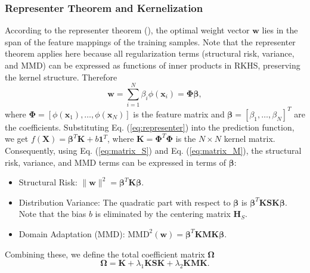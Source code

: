 \documentclass[a4paper]{cas-sc}
\begin{document}
\subsubsection{Representer Theorem and Kernelization}
According to the representer theorem (\cite{scholkopf2001representer}), the optimal weight vector $\boldsymbol{w}$ lies in the span of the feature mappings of the training samples. Note that the representer theorem applies here because all regularization terms (structural risk, variance, and MMD) can be expressed as functions of inner products in RKHS, preserving the kernel structure. Therefore
\begin{equation}
\label{eq:representer}
\boldsymbol{w} = \sum_{i=1}^{N} \beta_i \phi(\boldsymbol{x}_i) = \boldsymbol{\Phi} \boldsymbol{\beta},
\end{equation}
where $\boldsymbol{\Phi} = [\phi(\boldsymbol{x}_1), \dots, \phi(\boldsymbol{x}_N)]$ is the feature matrix and $\boldsymbol{\beta} = [\beta_1, \dots, \beta_N]^T$ are the coefficients.
Substituting Eq. (\ref{eq:representer}) into the prediction function, we get $f(\boldsymbol{X}) = \boldsymbol{\beta}^T \boldsymbol{K} + b \boldsymbol{1}^T$, where $\boldsymbol{K} = \boldsymbol{\Phi}^T \boldsymbol{\Phi}$ is the $N \times N$ kernel matrix.
Consequently, using Eq. (\ref{eq:matrix_S}) and Eq. (\ref{eq:matrix_M}), the structural risk, variance, and MMD terms can be expressed in terms of $\boldsymbol{\beta}$:
\begin{itemize}
    \item Structural Risk: $\|\boldsymbol{w}\|^2 = \boldsymbol{\beta}^T \boldsymbol{K} \boldsymbol{\beta}$.
    \item Distribution Variance: The quadratic part with respect to $\boldsymbol{\beta}$ is $\boldsymbol{\beta}^T \boldsymbol{K} \mathbf{S} \boldsymbol{K} \boldsymbol{\beta}$. Note that the bias $b$ is eliminated by the centering matrix $\boldsymbol{H}_S$.
    \item Domain Adaptation (MMD): $\text{MMD}^2(\boldsymbol{w}) = \boldsymbol{\beta}^T \boldsymbol{K} \mathbf{M} \boldsymbol{K} \boldsymbol{\beta}$.
\end{itemize}

Combining these, we define the total coefficient matrix $\boldsymbol{\Omega}$
\begin{equation}
\label{eq:Omega}
\boldsymbol{\Omega} = \boldsymbol{K} + \lambda_1 \boldsymbol{K} \mathbf{S} \boldsymbol{K} + \lambda_2 \boldsymbol{K} \mathbf{M} \boldsymbol{K}.
\end{equation}
\end{document}
